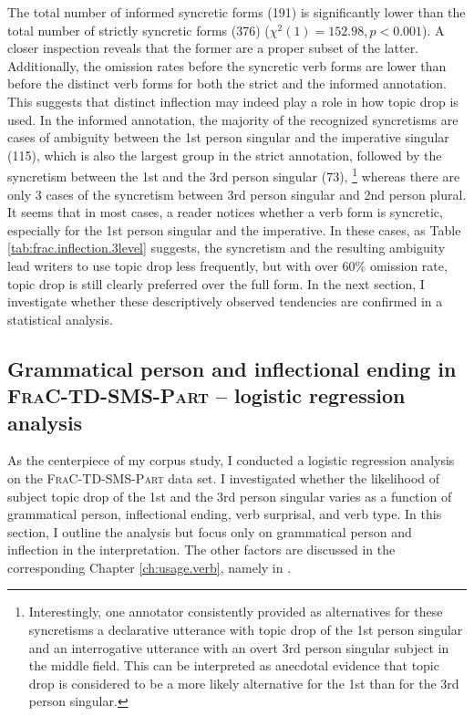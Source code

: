\noindent
The total number of informed syncretic forms (191) is significantly lower than the total number of strictly syncretic forms (376) ($\chi^2(1) = 152.98, p < 0.001$).
A closer inspection reveals that the former are a proper subset of the latter.
Additionally, the omission rates before the syncretic verb forms are lower than before the distinct verb forms for both the strict and the informed annotation.
This suggests that distinct inflection may indeed play a role in how topic drop is used.
In the informed annotation, the majority of the recognized syncretisms are cases of ambiguity between the 1st person singular and the imperative  singular (115), which is also the largest group in the strict annotation, followed by the syncretism between the 1st and the 3rd person singular (73),%
\footnote{Interestingly, one annotator consistently provided as alternatives for these syncretisms a declarative utterance with topic drop of the 1st person singular and an interrogative utterance with an overt 3rd person singular subject in the middle field.
This can be interpreted as anecdotal evidence that topic drop is considered to be a more likely alternative for the 1st than for the 3rd person singular.}
%
whereas there are only 3 cases of the syncretism between 3rd person singular and 2nd person plural.
It seems that in most cases, a reader notices whether a verb form is syncretic, especially for the 1st person singular and the imperative. 
In these cases, as Table \ref{tab:frac.inflection.3level} suggests, the syncretism and the resulting ambiguity lead writers to use topic drop less frequently, but with over 60\% omission rate, topic drop is still clearly preferred over the full form.
In the next section, I investigate whether these descriptively observed tendencies are confirmed in a statistical analysis. 

\subsection{Grammatical person and inflectional ending in \textsc{FraC-TD-SMS-Part} -- logistic regression analysis}\label{sec:frac.td.part.regression.person}
As the centerpiece of my corpus study,  I conducted a logistic regression analysis on the \textsc{FraC-TD-SMS-Part} data set.
I investigated whether the likelihood of subject topic drop of the 1st and the 3rd person singular varies as a function of grammatical person, inflectional ending, verb surprisal, and verb type.
In this section, I outline the analysis but focus only on grammatical person and inflection in the interpretation.
The other factors are discussed in the corresponding Chapter \ref{ch:usage.verb}, namely in .

